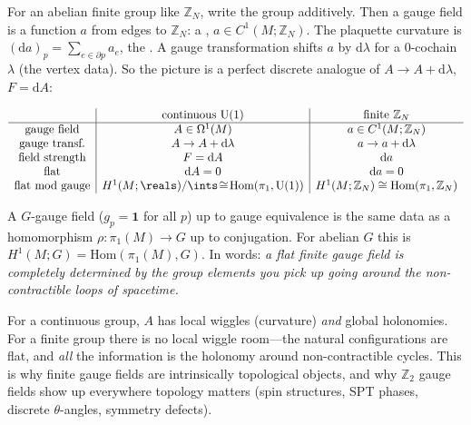 \documentclass[11pt]{article}
\newcommand{\dd}{\mathrm{d}}                 %
\newcommand{\Uone}{\mathrm{U}(1)}
\newcommand{\Ztwo}{\mathbb{Z}_2}
\newcommand{\ZN}{\mathbb{Z}_N}
\begin{document}
For an abelian finite group like $\ZN$, write the group additively. Then a gauge field
is a function $a$ from edges to $\ZN$: a , $a\in C^1(M;\ZN)$. The
plaquette curvature is $(\dd a)_p = \sum_{e\in\partial p} a_e$, the .
A gauge transformation shifts $a$ by $\dd\lambda$ for a $0$-cochain $\lambda$ (the
vertex data). So the picture is a perfect discrete analogue of $A\to A+\dd\lambda$,
$F=\dd A$:

\begin{eequation}
\[
\begin{array}{c|c|c}
 & \text{continuous } \Uone & \text{finite } \ZN \\\hline
\text{gauge field} & A\in \Omega^1(M) & a\in C^1(M;\ZN)\\
\text{gauge transf.} & A\to A+\dd\lambda & a\to a+\dd\lambda\\
\text{field strength} & F=\dd A & \dd a\\
\text{flat} & \dd A=0 & \dd a=0\\
\text{flat mod gauge} & H^1(M;\reals)/\ints \!\cong\! \mathrm{Hom}(\pi_1,\Uone) & H^1(M;\ZN)\cong\mathrm{Hom}(\pi_1,\ZN)
\end{array}
\]
\end{eequation}

\begin{ddefinition}[Flat finite gauge field = cohomology class = representation of $\pi_1$]
A  $G$-gauge field ($g_p=\mathbf 1$ for all $p$) up to gauge equivalence is
the same data as a homomorphism $\rho:\pi_1(M)\to G$ up to conjugation. For abelian $G$
this is $H^1(M;G)=\mathrm{Hom}(\pi_1(M),G)$. In words: \emph{a flat finite gauge field
is completely determined by the group elements you pick up going around the
non-contractible loops of spacetime.}
\end{ddefinition}

\begin{iintuition}
For a continuous group, $A$ has local wiggles (curvature) \emph{and} global holonomies.
For a finite group there is no local wiggle room---the natural configurations are flat,
and \emph{all} the information is the holonomy around non-contractible cycles. This is
why finite gauge fields are intrinsically topological objects, and why $\Ztwo$ gauge
fields show up everywhere topology matters (spin structures, SPT phases, discrete
$\theta$-angles, symmetry defects).
\end{iintuition}
\end{document}
